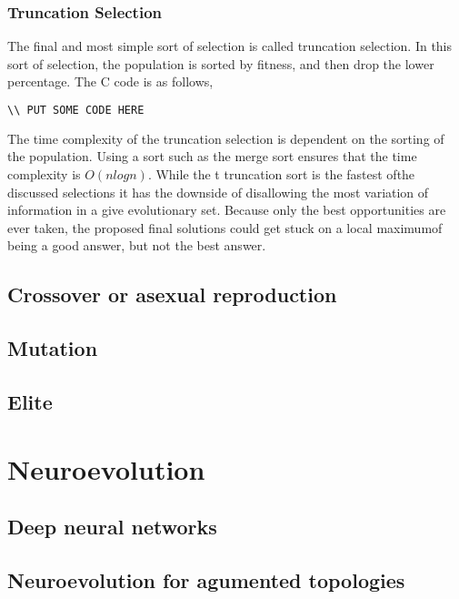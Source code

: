\subsubsection{Truncation Selection}
The final and most simple sort of selection is called truncation selection. 
In this sort of selection, the population is sorted by fitness, and then drop the lower
percentage. The C code is as follows,
\begin{lstlisting}[language=C]
\\ PUT SOME CODE HERE
\end{lstlisting}
The time complexity of the truncation selection is dependent on the sorting of the population.
Using a sort such as the merge sort ensures that the time complexity is $O(nlogn)$.
While the t truncation sort is the fastest ofthe discussed selections it has the downside of
disallowing the most variation of information in a give evolutionary set. 
Because only the best opportunities are ever taken, the proposed final solutions could get stuck
on a local maximumof being a good answer, but not the best answer.

\subsection{Crossover or asexual reproduction}

\subsection{Mutation}

\subsection{Elite}

\section{Neuroevolution}

\subsection{Deep neural networks}

\subsection{Neuroevolution for agumented topologies}
